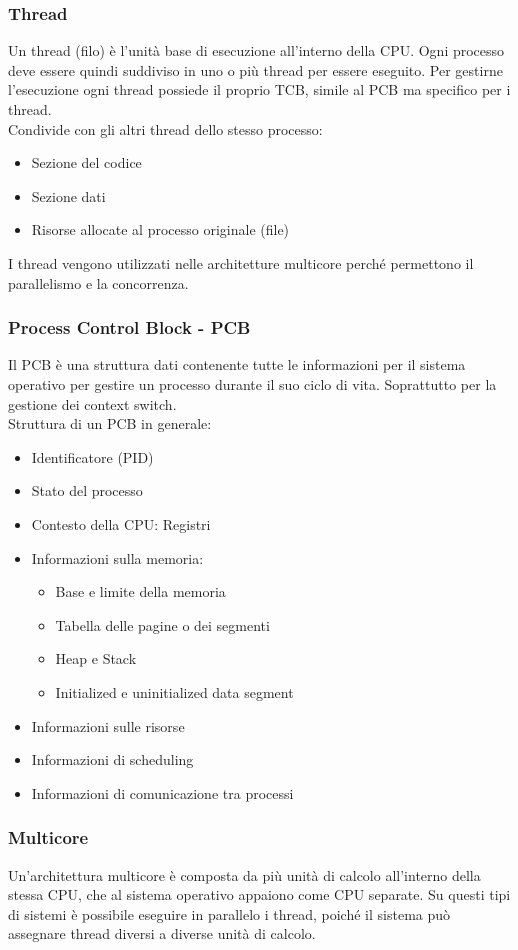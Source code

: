 \documentclass[a4paper]{article}
\begin{document}
\subsubsection*{Thread}
Un thread (filo) è l'unità base di esecuzione all'interno della CPU. Ogni processo deve essere quindi suddiviso in uno o più thread per essere eseguito.
Per gestirne l'esecuzione ogni thread possiede il proprio TCB, simile al PCB ma specifico per i thread. \\
Condivide con gli altri thread dello stesso processo:
\begin{itemize}
	\item Sezione del codice
	\item Sezione dati
	\item Risorse allocate al processo originale (file)
\end{itemize}
I thread vengono utilizzati nelle architetture multicore perché permettono il parallelismo e la concorrenza.
\subsubsection*{Process Control Block - PCB}
Il PCB è una struttura dati contenente tutte le informazioni per il sistema operativo per gestire un processo durante il suo ciclo di vita. Soprattutto per la gestione dei context switch. \\
Struttura di un PCB in generale:
\begin{itemize}
	\item Identificatore (PID)
	\item Stato del processo
	\item Contesto della CPU: Registri
	\item Informazioni sulla memoria:
	\begin{itemize}
		\item Base e limite della memoria
		\item Tabella delle pagine o dei segmenti
		\item Heap e Stack
		\item Initialized e uninitialized data segment
	\end{itemize}
	\item Informazioni sulle risorse
	\item Informazioni di scheduling
	\item Informazioni di comunicazione tra processi
\end{itemize} 
\subsubsection*{Multicore}
Un'architettura multicore è composta da più unità di calcolo all'interno della stessa CPU, che al sistema operativo appaiono come CPU separate.
Su questi tipi di sistemi è possibile eseguire in parallelo i thread, poiché il sistema può assegnare thread diversi a diverse unità di calcolo.
\end{document}
